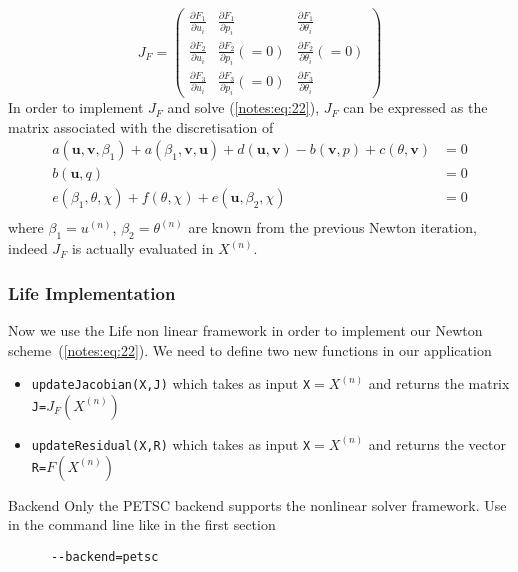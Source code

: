   \begin{equation}
    \label{notes:eq:35}
    J_F =
    \begin{pmatrix}
      \frac{\partial F_1}{\partial u_i} & \frac{\partial F_1}{\partial p_i} & \frac{\partial F_1}{\partial \theta_i} \\
      {\frac{\partial F_2}{\partial u_i}} & {\frac{\partial F_2}{\partial p_i}}(=0) & {\frac{\partial F_2}{\partial \theta_i}}(=0) \\
      \frac{\partial F_3}{\partial u_i} & {\frac{\partial F_3}{\partial p_i}}(=0) & \frac{\partial F_3}{\partial \theta_i}
    \end{pmatrix}
  \end{equation}
  In order to implement $J_F$ and solve (\ref{notes:eq:22}), $J_F$ can be
  expressed as the matrix associated with the discretisation of
  \begin{equation}
    \label{notes:eq:37}
    \begin{array}{rl}
      a(\mathbf{u},\mathbf{v},\beta_1) + a(\beta_1, \mathbf{v}, \mathbf{u})+d(\mathbf{u},\mathbf{v})-b(\mathbf{v},p)+c(\theta,\mathbf{v}) &= 0\\
      b(\mathbf{u},q)&=0\\
      e(\beta_1,\theta,\chi)+f(\theta,\chi)+e(\mathbf{u},\beta_2,\chi)&=0\\
    \end{array}
  \end{equation}
  where $\beta_1 = u^{(n)}$, $\beta_2=\theta^{(n)}$ are known from the
  previous Newton iteration, indeed $J_F$ is actually evaluated in $X^{(n)}$.

\subsubsection{Life Implementation}
  Now we use the Life non linear framework in order to implement our
  Newton scheme~(\ref{notes:eq:22}).
  We need to define two new functions in our application
  \begin{itemize}
  \item \texttt{updateJacobian(X,J)} which takes as input \texttt{X}$=X^{(n)}$ and returns the matrix \texttt{J=}$J_F(X^{(n)})$
  \item \texttt{updateResidual(X,R)} which takes as input \texttt{X}$=X^{(n)}$ and returns the vector \texttt{R=}$F(X^{(n)})$
  \end{itemize}

  \begin{remark}{Backend}
    Only the PETSC backend supports the nonlinear solver framework.
    Use  in the command line like in the first section
    \begin{lstlisting}
      --backend=petsc
    \end{lstlisting}
  \end{remark}

